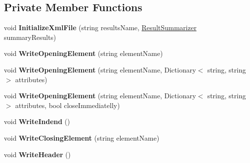 \subsection*{Private Member Functions}
\begin{DoxyCompactItemize}
\item 
\mbox{\label{class_unity_test_1_1_xml_result_writer_a36f95b374224c1f0a15ac1b8bb3f3745}} 
void {\bfseries Initialize\+Xml\+File} (string results\+Name, \hyperlink{class_unity_test_1_1_result_summarizer}{Result\+Summarizer} summary\+Results)
\item 
\mbox{\label{class_unity_test_1_1_xml_result_writer_af405573eba8842ac9afddc2e746b033e}} 
void {\bfseries Write\+Opening\+Element} (string element\+Name)
\item 
\mbox{\label{class_unity_test_1_1_xml_result_writer_a6c92a441bec1dd219caba53001ba6af1}} 
void {\bfseries Write\+Opening\+Element} (string element\+Name, Dictionary$<$ string, string $>$ attributes)
\item 
\mbox{\label{class_unity_test_1_1_xml_result_writer_ad750b3e69241b36a1e0d0d7b0d2516fe}} 
void {\bfseries Write\+Opening\+Element} (string element\+Name, Dictionary$<$ string, string $>$ attributes, bool close\+Immediatelly)
\item 
\mbox{\label{class_unity_test_1_1_xml_result_writer_a6be40bc3542fc926cab66a7a2124b065}} 
void {\bfseries Write\+Indend} ()
\item 
\mbox{\label{class_unity_test_1_1_xml_result_writer_a3833948863c5a7fde59ca9d1dd1f2cdf}} 
void {\bfseries Write\+Closing\+Element} (string element\+Name)
\item 
\mbox{\label{class_unity_test_1_1_xml_result_writer_aa3fa745cbd99e8c7ab5e22a326249d8c}} 
void {\bfseries Write\+Header} ()
\item 
\mbox{\label{class_unity_test_1_1_xml_result_writer_aa5aac36f944c738c716c535ee3cb591f}} 

\end{DoxyCompactItemize}
